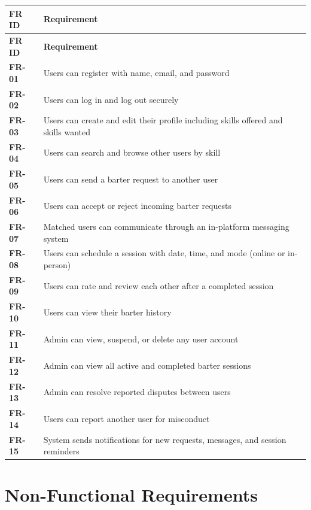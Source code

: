 \documentclass[12pt,a4paper]{article}
\begin{document}
\begin{longtable}{>{\bfseries}p{1.8cm} p{11.5cm}}
\toprule
\textbf{FR ID} & \textbf{Requirement} \\
\midrule
\endfirsthead
\toprule
\textbf{FR ID} & \textbf{Requirement} \\
\midrule
\endhead
\bottomrule
\endfoot
FR-01 & Users can register with name, email, and password \\
FR-02 & Users can log in and log out securely \\
FR-03 & Users can create and edit their profile including skills offered and skills wanted \\
FR-04 & Users can search and browse other users by skill \\
FR-05 & Users can send a barter request to another user \\
FR-06 & Users can accept or reject incoming barter requests \\
FR-07 & Matched users can communicate through an in-platform messaging system \\
FR-08 & Users can schedule a session with date, time, and mode (online or in-person) \\
FR-09 & Users can rate and review each other after a completed session \\
FR-10 & Users can view their barter history \\
FR-11 & Admin can view, suspend, or delete any user account \\
FR-12 & Admin can view all active and completed barter sessions \\
FR-13 & Admin can resolve reported disputes between users \\
FR-14 & Users can report another user for misconduct \\
FR-15 & System sends notifications for new requests, messages, and session reminders \\
\end{longtable}

\section{Non-Functional Requirements}
\vspace{4pt}
\end{document}
